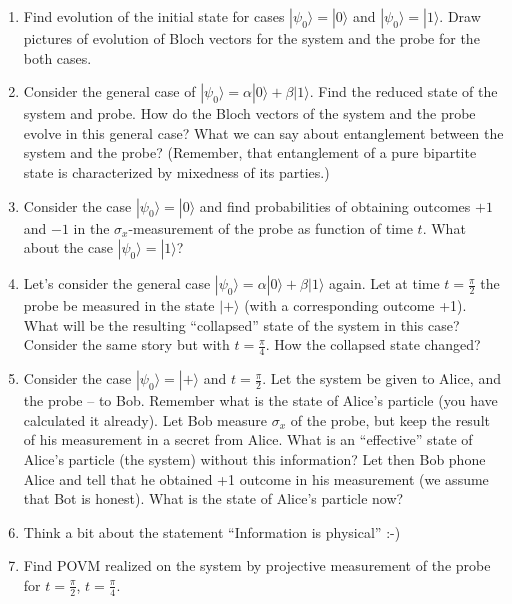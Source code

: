 \documentclass[a4paper,10pt]{article}
\newcommand{\ket}[1]{|#1\rangle}
\begin{document}
\begin{enumerate}
	\item Find evolution of the initial state for cases $\ket{\psi_{0}}=\ket{0}$ and $\ket{\psi_{0}}=\ket{1}$.
	Draw pictures of evolution of Bloch vectors for the system and the probe for the both cases.
	\item Consider the general case of $\ket{\psi_{0}}=\alpha\ket{0}+\beta\ket{1}$. Find the reduced state of the system and probe.
	How do the Bloch vectors of the system and the probe evolve in this general case?
	What we can say about entanglement between the system and the probe? (Remember, that entanglement of a pure bipartite state is characterized by mixedness of its parties.)
	\item Consider the case $\ket{\psi_{0}}=\ket{0}$ and find probabilities of obtaining outcomes $+1$ and $-1$ in the $\sigma_{x}$-measurement of the probe as function of time $t$.
	What about the case $\ket{\psi_{0}}=\ket{1}$?
	\item Let's consider the general case $\ket{\psi_{0}}=\alpha\ket{0}+\beta\ket{1}$ again. Let at time $t=\frac{\pi}{2}$ the probe be measured in the state $\ket{+}$ (with a corresponding outcome +1). What will be the resulting ``collapsed'' state of the system in this case? Consider the same story but with $t=\frac{\pi}{4}$. How the collapsed state changed?
	\item Consider the case $\ket{\psi_{0}}=\ket{+}$ and $t=\frac{\pi}{2}$. Let the system be given to Alice, and the probe -- to Bob. Remember what is the state of Alice's particle (you have calculated it already).
	Let Bob measure $\sigma_{x}$ of the probe, but keep the result of his measurement in a secret from Alice.
	What is an ``effective'' state of Alice's particle (the system) without this information?
	Let then Bob phone Alice and tell that he obtained +1 outcome in his measurement (we assume that Bot is honest). 
	What is the state of Alice's particle now?
	\item Think a bit about the statement ``Information is physical'' :-)
	\item Find POVM realized on the system by projective measurement of the probe for $t=\frac{\pi}{2}$, $t=\frac{\pi}{4}$.
\end{enumerate}
\end{document}
